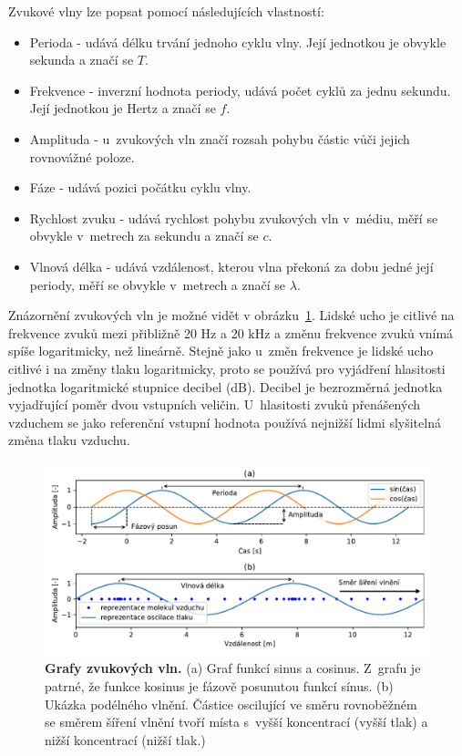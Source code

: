 Zvukové vlny lze popsat pomocí následujících vlastností:

\begin{itemize}
    \item Perioda - udává délku trvání jednoho cyklu vlny. Její jednotkou je obvykle sekunda a značí se $T$.
    \item Frekvence - inverzní hodnota periody, udává počet cyklů za jednu sekundu. Její jednotkou je Hertz a značí se $f$.
    \item Amplituda - u~zvukových vln značí rozsah pohybu částic vůči jejich rovnovážné poloze.
    \item Fáze - udává pozici počátku cyklu vlny.
    \item Rychlost zvuku - udává rychlost pohybu zvukových vln v~médiu, měří se obvykle v~metrech za sekundu a značí se $c$.
    \item Vlnová délka - udává vzdálenost, kterou vlna překoná za dobu jedné její periody, měří se obvykle v~metrech a značí se $\lambda$.
\end{itemize}

Znázornění zvukových vln je možné vidět v obrázku~\ref{obr_sinusoidy}. Lidské ucho je citlivé na frekvence zvuků mezi přibližně 20 Hz a 20 kHz a změnu frekvence zvuků vnímá spíše logaritmicky, než lineárně. Stejně jako u~změn frekvence je lidské ucho citlivé i na změny tlaku logaritmicky, proto se používá pro vyjádření hlasitosti jednotka logaritmické stupnice decibel (dB). Decibel je bezrozměrná jednotka vyjadřující poměr dvou vstupních veličin. U~hlasitosti zvuků přenášených vzduchem se jako referenční vstupní hodnota používá nejnižší lidmi slyšitelná změna tlaku vzduchu.\cite{music_theory}\cite{db}

\begin{figure}[h]
    \centering
    \includegraphics[width=\textwidth]{obrazky/sinusoidy.pdf}
    \caption{\textbf{Grafy zvukových vln.} (a) Graf funkcí sinus a cosinus. Z~grafu je patrné, že funkce kosinus je fázově posunutou funkcí sínus. (b) Ukázka podélného vlnění. Částice oscilující ve směru rovnoběžném se směrem šíření vlnění tvoří místa s~vyšší koncentrací (vyšší tlak) a nižší koncentrací (nižší tlak.)}
    \label{obr_sinusoidy}
\end{figure}

